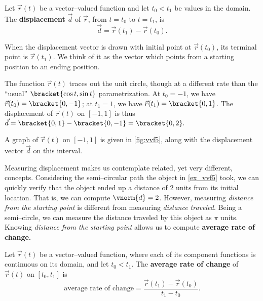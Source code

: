 {Let $\vec r(t)$ be a vector--valued function and let $t_0<t_1$ be values in the domain. The \textbf{displacement} $\vec d$ of $\vec r$, from $t=t_0$ to $t=t_1$, is $$\vec d=\vec r(t_1)-\vec r(t_0).$$}

When the displacement vector is drawn with initial point at $\vec r(t_0)$, its terminal point is $\vec r(t_1)$. We think of it as the vector which points from a starting position to an ending position.

{The function $\vec r(t)$ traces out the unit circle, though at a different rate than the ``usual'' $\bracket{\cos t,\sin t}$ parametrization. At $t_0=-1$, we have $\vec r(t_0) =\bracket{0,-1}$; at $t_1=1$, we have $\vec r(t_1) =\bracket{0,1}$. The displacement of $\vec r(t)$ on $[-1,1]$ is thus $\vec d =\bracket{0,1}-\bracket{0,-1}=\bracket{0,2}.$

A graph of $\vec r(t)$ on $[-1,1]$ is given in \autoref{fig:vvf5}, along with the displacement vector $\vec d$ on this interval.}

Measuring displacement makes us contemplate related, yet very different, concepts. Considering the semi--circular path the object in \autoref{ex_vvf5} took, we can quickly verify that the object ended up a distance of 2 units from its initial location. That is, we can compute $\vnorm{d} = 2$. However, measuring \emph{distance from the starting point} is different from measuring \emph{distance traveled}. Being a semi--circle, we can measure the distance traveled by this object as $\pi%
$ units. Knowing \emph{distance from the starting point} allows us to compute \textbf{average rate of change.}

{Let $\vec r(t)$ be a vector--valued function, where each of its component functions is continuous on its domain, and let $t_0<t_1$. The \textbf{average rate of change} of $\vec r(t)$ on $[t_0,t_1]$ is
$$\text{average rate of change} = \frac{\vec r(t_1) - \vec r(t_0)}{t_1-t_0}.$$}

